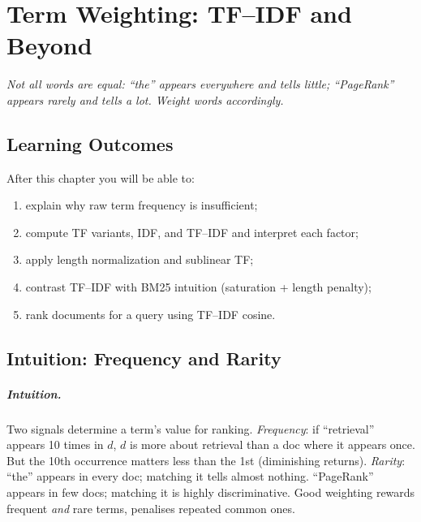 \chapter{Term Weighting: TF--IDF and Beyond}\label{ch:tfidf}
\begin{center}\small\textit{Not all words are equal: ``the'' appears everywhere and tells little; ``PageRank'' appears rarely and tells a lot. Weight words accordingly.}\end{center}

\noindent{}
\vspace{0.4em}

\section*{Learning Outcomes}
After this chapter you will be able to:
\begin{enumerate}[label=(L\arabic*)]
  \item explain why raw term frequency is insufficient;
  \item compute TF variants, IDF, and TF--IDF and interpret each factor;
  \item apply length normalization and sublinear TF;
  \item contrast TF--IDF with BM25 intuition (saturation + length penalty);
  \item rank documents for a query using TF--IDF cosine.
\end{enumerate}

\section{Intuition: Frequency and Rarity}\label{sec:intuition-tfidf}
\paragraph{Intuition.} Two signals determine a term's value for ranking. \emph{Frequency}: if ``retrieval'' appears 10 times in $d$, $d$ is more about retrieval than a doc where it appears once. But the 10th occurrence matters less than the 1st (diminishing returns). \emph{Rarity}: ``the'' appears in every doc; matching it tells almost nothing. ``PageRank'' appears in few docs; matching it is highly discriminative. Good weighting rewards frequent \emph{and} rare terms, penalises repeated common ones.

